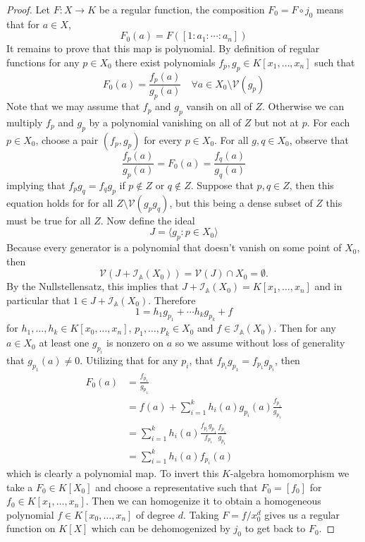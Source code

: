 \documentclass[40pt]{article}
\newcommand{\A}{\mathbb{A}}
\newcommand{\I}{\mathcal{I}}
\newcommand{\V}{\mathcal{V}}
\newcommand{\la}{\langle}
\newcommand{\ra}{\rangle}
\theoremstyle{remark}
\begin{document}
				\begin{proof}
					Let $F: X \to K$ be a regular function, the composition $F_0 = F \circ j_0$ means that for $a \in X$, 
					\[
					F_0(a) = F([1:a_1:\cdots:a_n])
					\]
					It remains to prove that this map is polynomial. By definition of regular functions for any $p \in X_0$ there exist polynomials $f_p, g_p \in K[x_1,\dots,x_n]$ such that 
					\[
					F_0(a) = \frac{f_p(a)}{g_p(a)} \quad \forall a \in X_0 \setminus \V(g_p)
					\]
					Note that we may assume that $f_p$ and $g_p$ vansih on all of $Z$. Otherwise we can multiply $f_p$ and $g_p$ by a polynomial vanishing on all of $Z$ but not at $p$. For each $p \in X_0$, choose a pair $(f_p,g_p)$ for every $p \in X_0$. For all $g,q \in X_0$, observe that 
					\[
					\frac{f_p(a)}{g_p(a)} = F_0(a) = \frac{f_q(a)}{g_q(a)}
					\]
					implying that $f_pg_q = f_qg_p$ if $p \not \in Z$ or $q \not \in Z$. Suppose that $p,q \in Z$, then this equation holds for for all $Z \setminus \V(g_pg_q)$, but this being a dense subset of $Z$ this must be true for all $Z$. Now define the ideal 
					\[
					J = \la g_p : p \in X_0 \ra
					\]
					Because every generator is a polynomial that doesn't vanish on some point of $X_0$, then 
					\[
					\V(J + \I_\A(X_0)) = \V(J) \cap X_0 = \emptyset.
					\]
					By the Nullstellensatz, this implies that $J + \I_\A(X_0) = K[x_1,\dots,x_n]$ and in particular that $1 \in J + \I_\A(X_0)$. Therefore 
					\[
					1 = h_1g_{p_1} + \cdots h_kg_{p_k} + f
					\]
					for $h_1,\dots,h_k \in K[x_0,\dots,x_n]$, $p_1,\dots,p_k \in X_0$ and $f \in \I_\A(X_0)$. Then for any $a \in X_0$ at least one $g_{p_i}$ is nonzero on $a$ so we assume without loss of generality that $g_{p_1}(a) \neq 0$. Utilizing that for any $p_i$, that $f_{p_i}g_{p_1} = f_{p_1}g_{p_i}$, then
					\begin{align}
						F_0(a) &= \frac{f_{p_1}}{g_{p_1}} \\
						&= f(a) + \sum_{i=1}^k h_i(a)g_{p_i}(a) \frac{f_{p_1}}{g_{p_1}} \\
						&= \sum_{i=1}^k h_i(a)\frac{f_{p_i}g_{p_1}}{f_{p_1}}\frac{f_{p_1}}{g_{p_1}} \\
						&= \sum_{i=1}^k h_i (a)f_{p_i}(a)
					\end{align}
					which is clearly a polynomial map. To invert this $K$-algebra homomorphism we take a $F_0 \in K[X_0]$ and choose a representative such that $F_0 = [f_0]$ for $f_0 \in K[x_1,\dots,x_n]$. Then we can homogenize it to obtain a homogeneous polynomial $f \in K[x_0,\dots,x_n]$ of degree $d$. Taking $F = f/x_0^d$ gives us a regular function on $K[X]$ which can be dehomogenized by $j_0$ to get back to $F_0$. 
				\end{proof}
\end{document}
